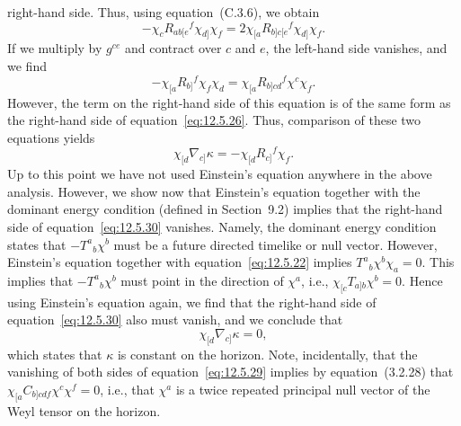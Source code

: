 right-hand side. Thus, using equation~(C.3.6), we obtain
\begin{equation}
 -\chi_cR_{ab[e}{}^f\chi_{d]}\chi_f
 =2\chi_{[a}R_{b]c[e}{}^f\chi_{d]}\chi_f .
 \tag{12.5.28}\label{eq:12.5.28}
\end{equation}
If we multiply by \(g^{ce}\) and contract over \(c\) and \(e\), the left-hand side
vanishes, and we find
\begin{equation}
 -\chi_{[a}R_{b]}{}^f\chi_f\chi_d
 =\chi_{[a}R_{b]cd}{}^f\chi^c\chi_f .
 \tag{12.5.29}\label{eq:12.5.29}
\end{equation}
However, the term on the right-hand side of this equation is of the same form as the
right-hand side of equation~\eqref{eq:12.5.26}. Thus, comparison of these two
equations yields
\begin{equation}
 \chi_{[d}\nabla_{c]}\kappa=-\chi_{[d}R_{c]}{}^f\chi_f .
 \tag{12.5.30}\label{eq:12.5.30}
\end{equation}
Up to this point we have not used Einstein's equation anywhere in the above analysis.
However, we show now that Einstein's equation together with the dominant energy
condition (defined in Section~9.2) implies that the right-hand side of
equation~\eqref{eq:12.5.30} vanishes. Namely, the dominant energy condition states
that \(-T^a{}_b\chi^b\) must be a future directed timelike or null vector. However,
Einstein's equation together with equation~\eqref{eq:12.5.22} implies
\(T^a{}_b\chi^b\chi_a=0\). This implies that \(-T^a{}_b\chi^b\) must point in the
direction of \(\chi^a\), i.e., \(\chi_{[c}T_{a]b}\chi^b=0\). Hence using Einstein's
equation again, we find that the right-hand side of equation~\eqref{eq:12.5.30} also
must vanish, and we conclude that
\begin{equation}
 \chi_{[d}\nabla_{c]}\kappa=0 ,
 \tag{12.5.31}\label{eq:12.5.31}
\end{equation}
which states that \(\kappa\) is constant on the horizon. Note, incidentally, that the
vanishing of both sides of equation~\eqref{eq:12.5.29} implies by equation~(3.2.28)
that \(\chi_{[a}C_{b]cdf}\chi^c\chi^f=0\), i.e., that \(\chi^a\) is a twice repeated
principal null vector of the Weyl tensor on the horizon.

